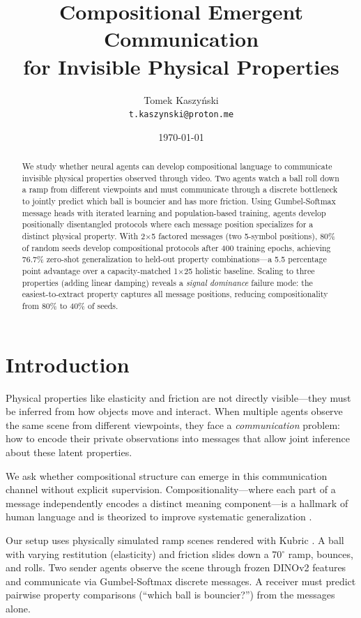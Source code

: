 \documentclass[11pt,a4paper]{article}
\title{Compositional Emergent Communication\\for Invisible Physical Properties}
\author{Tomek Kaszy\'{n}ski\\
\texttt{t.kaszynski@proton.me}}
\date{\today}
\begin{document}
\maketitle

\begin{abstract}
We study whether neural agents can develop compositional language to communicate invisible physical properties observed through video.
Two agents watch a ball roll down a ramp from different viewpoints and must communicate through a discrete bottleneck to jointly predict which ball is bouncier and has more friction.
Using Gumbel-Softmax message heads with iterated learning and population-based training, agents develop positionally disentangled protocols where each message position specializes for a distinct physical property.
With 2$\times$5 factored messages (two 5-symbol positions), 80\% of random seeds develop compositional protocols after 400 training epochs, achieving 76.7\% zero-shot generalization to held-out property combinations---a 5.5 percentage point advantage over a capacity-matched 1$\times$25 holistic baseline.
Scaling to three properties (adding linear damping) reveals a \emph{signal dominance} failure mode: the easiest-to-extract property captures all message positions, reducing compositionality from 80\% to 40\% of seeds.
\end{abstract}

\section{Introduction}
\label{sec:intro}

Physical properties like elasticity and friction are not directly visible---they must be inferred from how objects move and interact.
When multiple agents observe the same scene from different viewpoints, they face a \emph{communication} problem: how to encode their private observations into messages that allow joint inference about these latent properties.

We ask whether compositional structure can emerge in this communication channel without explicit supervision.
Compositionality---where each part of a message independently encodes a distinct meaning component---is a hallmark of human language and is theorized to improve systematic generalization \citep{kirby2002emergence,lazaridou2018emergence}.

Our setup uses physically simulated ramp scenes rendered with Kubric \citep{greff2022kubric}.
A ball with varying restitution (elasticity) and friction slides down a 70$^\circ$ ramp, bounces, and rolls.
Two sender agents observe the scene through frozen DINOv2 \citep{oquab2024dinov2} features and communicate via Gumbel-Softmax \citep{jang2017categorical} discrete messages.
A receiver must predict pairwise property comparisons (``which ball is bouncier?'') from the messages alone.
\end{document}
